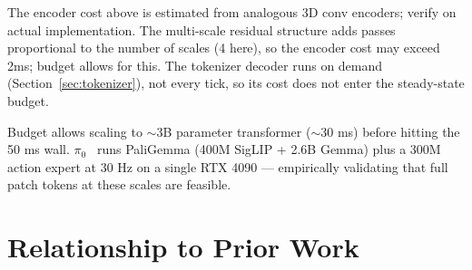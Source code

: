 \documentclass[11pt,a4paper]{article}
\begin{document}
\begin{openquestion}
The encoder cost above is estimated from analogous 3D conv encoders; verify on actual implementation. The multi-scale residual structure adds passes proportional to the number of scales (4 here), so the encoder cost may exceed 2ms; budget allows for this. The tokenizer decoder runs on demand (Section~\ref{sec:tokenizer}), not every tick, so its cost does not enter the steady-state budget.
\end{openquestion}

Budget allows scaling to $\sim$3B parameter transformer ($\sim$30 ms) before hitting the 50 ms wall. $\pi_0$~\cite{pi0} runs PaliGemma (400M SigLIP + 2.6B Gemma) plus a 300M action expert at 30 Hz on a single RTX 4090 --- empirically validating that full patch tokens at these scales are feasible.

\section{Relationship to Prior Work}
\end{document}
